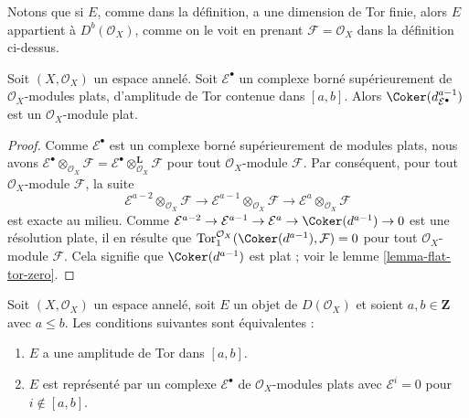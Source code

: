 \noindent
Notons que si $E$, comme dans la définition, a une dimension de Tor finie, alors $E$ appartient à $D^b(\mathcal{O}_X)$, comme on le voit en prenant $\mathcal{F} = \mathcal{O}_X$ dans la définition ci-dessus.

\begin{lemma}

\label{lemma-last-one-flat}
Soit $(X, \mathcal{O}_X)$ un espace annelé. Soit $\mathcal{E}^\bullet$ un complexe borné supérieurement de $\mathcal{O}_X$-modules plats, d'amplitude de Tor contenue dans $[a, b]$. Alors $\Coker(d_{\mathcal{E}^\bullet}^{a - 1})$ est un $\mathcal{O}_X$-module plat.
\end{lemma}

\begin{proof}

Comme $\mathcal{E}^\bullet$ est un complexe borné supérieurement de modules plats, nous avons
$\mathcal{E}^\bullet \otimes_{\mathcal{O}_X} \mathcal{F} =
\mathcal{E}^\bullet \otimes_{\mathcal{O}_X}^{\mathbf{L}} \mathcal{F}$
pour tout $\mathcal{O}_X$-module $\mathcal{F}$. Par conséquent, pour tout $\mathcal{O}_X$-module $\mathcal{F}$, la suite
$$
\mathcal{E}^{a - 2} \otimes_{\mathcal{O}_X} \mathcal{F} \to
\mathcal{E}^{a - 1} \otimes_{\mathcal{O}_X} \mathcal{F} \to
\mathcal{E}^a \otimes_{\mathcal{O}_X} \mathcal{F}
$$
est exacte au milieu. Comme
$\mathcal{E}^{a - 2} \to \mathcal{E}^{a - 1} \to \mathcal{E}^a \to
\Coker(d^{a - 1}) \to 0$
est une résolution plate, il en résulte que
$\text{Tor}_1^{\mathcal{O}_X}(\Coker(d^{a - 1}), \mathcal{F}) = 0$
pour tout $\mathcal{O}_X$-module $\mathcal{F}$. Cela signifie que
$\Coker(d^{a - 1})$ est plat ; voir le lemme \ref{lemma-flat-tor-zero}.

\end{proof}

\begin{lemma}

\label{lemma-tor-amplitude}
Soit $(X, \mathcal{O}_X)$ un espace annelé, soit $E$ un objet de $D(\mathcal{O}_X)$ et soient $a, b \in \mathbf{Z}$ avec $a \leq b$. Les conditions suivantes sont équivalentes :
\begin{enumerate}
\item $E$ a une amplitude de Tor dans $[a, b]$.
\item $E$ est représenté par un complexe $\mathcal{E}^\bullet$ de $\mathcal{O}_X$-modules plats avec $\mathcal{E}^i = 0$ pour $i \not \in [a, b]$.
\end{enumerate}

\end{lemma}

